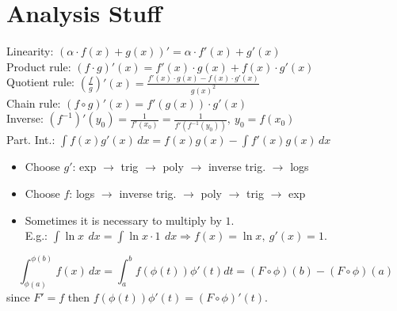 \section{Analysis Stuff}
\begin{definition*}
  Linearity: \((\alpha \cdot f(x) + g(x))' = \alpha \cdot f'(x) + g'(x)\) \\
  Product rule: \((f \cdot g)'(x) = f'(x)\cdot g(x) + f(x)\cdot g'(x)\) \\
  Quotient rule: \(\left(\frac{f}{g}\right)'(x) = \frac{f'(x)\cdot g(x) - f(x)\cdot g'(x)}{g(x)^2}\) \\
  Chain rule: \((f \circ g)'(x) = f'(g(x))\cdot g'(x)\) \\
  Inverse: \((f^{-1})'(y_0) = \frac{1}{f'(x_0)} = \frac{1}{f'(f^{-1}(y_0))}, \ y_0 = f(x_0)\) \\
  Part. Int.: \(\int f(x) g'(x) \,dx = f(x)g(x) - \int f'(x) g(x) \, dx\)
\end{definition*}

\begin{itemize}
    \item Choose $g'$: exp $\rightarrow$ trig $\rightarrow$ poly $\rightarrow$ inverse trig. $\rightarrow$ logs
    \item Choose $f$: logs $\rightarrow$ inverse trig. $\rightarrow$ poly $\rightarrow$ trig $\rightarrow$ exp
    \item Sometimes it is necessary to multiply by $1$. \\ E.g.: $\int \ln x \ \,dx = \int \ln x \cdot 1 \ \,dx \Rightarrow f(x) = \ln x, \ g'(x) = 1$.
\end{itemize}

\begin{definition*}[Substitution] \vspace{-7pt}
    \[\int_{\phi(a)}^{\phi(b)} f(x) \,dx = \int_a^b f(\phi(t)) \phi'(t) dt = (F \circ \phi)(b) - (F \circ \phi)(a)\]
    since $F'=f$ then $f(\phi(t))\phi'(t) = (F \circ \phi)'(t)$.
\end{definition*}

